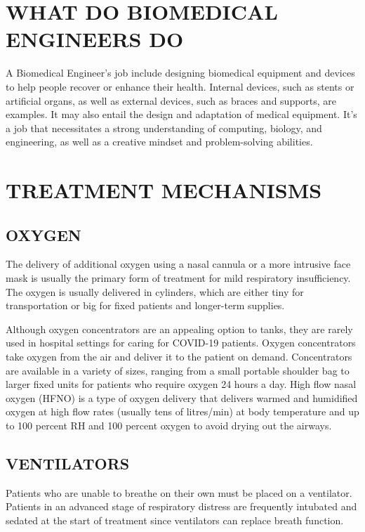 \documentclass{article}
\begin{document}
\section{WHAT DO BIOMEDICAL ENGINEERS DO}

A Biomedical Engineer's job include designing biomedical equipment and devices to help people recover or enhance their health.
Internal devices, such as stents or artificial organs, as well as external devices, such as braces and supports, are examples.
It may also entail the design and adaptation of medical equipment.
It's a job that necessitates a strong understanding of computing, biology, and engineering, as well as a creative mindset and problem-solving abilities.

\section{TREATMENT MECHANISMS}

\subsection{OXYGEN}

The delivery of additional oxygen using a nasal cannula or a more intrusive face mask is usually the primary form of treatment for mild respiratory insufficiency.
The oxygen is usually delivered in cylinders, which are either tiny for transportation or big for fixed patients and longer-term supplies.


Although oxygen concentrators are an appealing option to tanks, they are rarely used in hospital settings for caring for COVID-19 patients.
Oxygen concentrators take oxygen from the air and deliver it to the patient on demand.
Concentrators are available in a variety of sizes, ranging from a small portable shoulder bag to larger fixed units for patients who require oxygen 24 hours a day.
High flow nasal oxygen (HFNO) is a type of oxygen delivery that delivers warmed and humidified oxygen at high flow rates (usually tens of litres/min) at body temperature and up to 100 percent RH and 100 percent oxygen to avoid drying out the airways.

\subsection{VENTILATORS}

Patients who are unable to breathe on their own must be placed on a ventilator.
Patients in an advanced stage of respiratory distress are frequently intubated and sedated at the start of treatment since ventilators can replace breath function.
\end{document}
